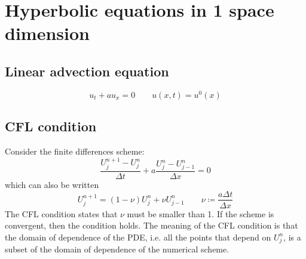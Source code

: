 \documentclass[12pt, openany]{report}
\theoremstyle{definition}
\begin{document}
\section{Hyperbolic equations in 1 space dimension}
\subsection{Linear advection equation}
\begin{equation}
	u_t + au_x = 0 \qquad u(x,t)=u^0(x)
\end{equation}
\subsection{CFL condition}
Consider the finite differences scheme:
\begin{equation}
	\frac{U_j^{n+1}-U_j^n}{\Delta t} + a \frac{U_j^n-U_{j-1}^n}{\Delta x} = 0
\end{equation}
which can also be written 
\begin{equation}
	U_j^{n+1} = (1-\nu)U_j^n + \nu U_{j-1}^n\qquad \nu \coloneqq \frac{a\Delta t}{\Delta x}
\end{equation}
The CFL condition states that $\nu$ must be smaller than 1. If the scheme is convergent, then the condition holds. The meaning of the CFL condition is that the domain of dependence of the PDE, i.e. all the points that depend on $U_j^n$, is a subset of the domain of dependence of the numerical scheme. 
\end{document}
